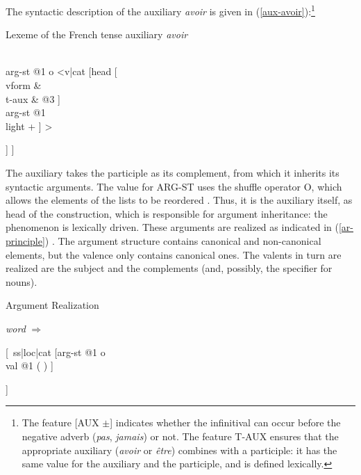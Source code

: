 \documentclass[output=paper]{langsci/langscibook}
\begin{document}
The syntactic description of the auxiliary \textit{avoir} is given in (\ref{aux-avoir}):\footnote{The feature [AUX $±$] indicates whether the infinitival can occur before the negative adverb (\textit{pas}, \textit{jamais}) or not. The feature T-AUX ensures that the appropriate auxiliary (\textit{avoir} or \textit{\^etre}) combines with a participle: it has the same value for the auxiliary and the participle, and is defined lexically.}



\begin{exe}
	\ex \label{aux-avoir} Lexeme of the French tense auxiliary \textit{avoir} 
	
	
	\begin{avm}
		[{ } cat & [{ } head  [{} \normalfont{\textit{verb}} \\
		t-aux & @3  \\
		aux   & + ]
		\\
		arg-st    @1   o <v|cat [{}head [{}\\
		vform & \\
		t-aux  & @3
		]\\
		arg-st  @1\\
		light +          
		] >		
		
		]
		]		
	\end{avm}
	
	
\end{exe}



The auxiliary takes the participle as its complement, from which it inherits its syntactic arguments. The value for ARG-ST uses the shuffle operator O, which allows the elements of the lists to be reordered \citep{Reape94a}. Thus, it is the auxiliary itself, as head of the construction, which is responsible for argument inheritance: the phenomenon is lexically driven. These arguments are realized as indicated in (\ref{ar-principle}) \citep[see][for the Argument Realization Principle]{GSag2000a-u}. The argument structure contains canonical and non-canonical elements, but the valence only contains canonical ones. The valents in turn are realized are the subject and the complements (and, possibly, the specifier for nouns).


\begin{exe}
	\ex \label{ar-principle}  Argument Realization \citep{BS2015a-u}
	
	\textit{word}  $\Rightarrow$ \begin{avm}
		
		[{} ss|loc|cat [{}arg-st @1 o \\
		val    @1 ( )
		]
		
		]
		
	\end{avm}
	
\end{exe}
\end{document}
